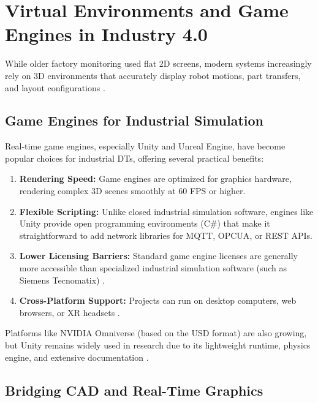 \section{Virtual Environments and Game Engines in Industry 4.0}
\label{sec:game_engines_vc}

While older factory monitoring used flat 2D screens, modern systems increasingly rely on 3D environments that accurately display robot motions, part transfers, and layout configurations \cite{Pajpach2022,Zheng2024}.

\subsection{Game Engines for Industrial Simulation}

Real-time game engines, especially Unity and Unreal Engine, have become popular choices for industrial \glspl{DT}, offering several practical benefits:
\begin{enumerate}
    \item \textbf{Rendering Speed:} Game engines are optimized for graphics hardware, rendering complex 3D scenes smoothly at 60 \gls{FPS} or higher.
    \item \textbf{Flexible Scripting:} Unlike closed industrial simulation software, engines like Unity provide open programming environments (C\#) that make it straightforward to add network libraries for \gls{MQTT}, \gls{OPCUA}, or \gls{REST} \glspl{API}.
    \item \textbf{Lower Licensing Barriers:} Standard game engine licenses are generally more accessible than specialized industrial simulation software (such as Siemens Tecnomatix) \cite{Pajpach2022}.
    \item \textbf{Cross-Platform Support:} Projects can run on desktop computers, web browsers, or \gls{XR} headsets \cite{Garcia2025}.
\end{enumerate}

Platforms like NVIDIA Omniverse (based on the \gls{USD} format) are also growing, but Unity remains widely used in research due to its lightweight runtime, physics engine, and extensive documentation \cite{Alexopoulos2025,Garcia2025,Pajpach2023}.

\subsection{Bridging \texorpdfstring{\gls{CAD}}{CAD} and Real-Time Graphics}

